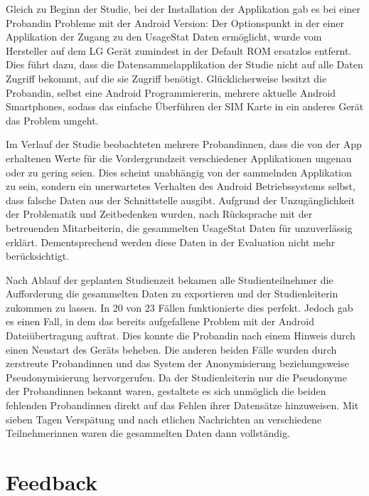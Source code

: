 Gleich zu Beginn der Studie, bei der Installation der Applikation gab es bei einer Probandin Probleme mit der Android Version:
Der Optionspunkt in der einer Applikation der Zugang zu den UsageStat Daten ermöglicht, wurde vom Hersteller auf dem LG Gerät zumindest in der Default ROM ersatzlos entfernt.
Dies führt dazu, dass die Datensammelapplikation der Studie nicht auf alle Daten Zugriff bekommt, auf die sie Zugriff benötigt.
Glücklicherweise besitzt die Probandin, selbst eine Android Programmiererin, mehrere aktuelle Android Smartphones, sodass das einfache Überführen der SIM Karte in ein anderes Gerät das Problem umgeht.
\par
Im Verlauf der Studie beobachteten mehrere Probandinnen,  dass die von der App erhaltenen Werte für die Vordergrundzeit verschiedener Applikationen ungenau oder zu gering seien.
Dies scheint unabhängig von der sammelnden Applikation zu sein, sondern ein unerwartetes Verhalten des Android Betriebssystems selbst, dass falsche Daten aus der Schnittstelle ausgibt.
Aufgrund der Unzugänglichkeit der Problematik und Zeitbedenken wurden, nach Rücksprache mit der betreuenden Mitarbeiterin, die gesammelten UsageStat Daten für unzuverlässig erklärt.
Dementsprechend werden diese Daten in der Evaluation nicht mehr berücksichtigt.
\par
Nach Ablauf der geplanten Studienzeit bekamen alle Studienteilnehmer die Aufforderung die gesammelten Daten zu exportieren und der Studienleiterin zukommen zu lassen. 
In 20 von 23 Fällen funktionierte dies perfekt.
Jedoch gab es einen Fall, in dem das bereits aufgefallene Problem \cite{androidbug} mit der Android Dateiübertragung auftrat.
Dies konnte die Probandin nach einem Hinweis durch einen Neustart des Geräts beheben.
Die anderen beiden Fälle wurden durch zerstreute Probandinnen und das System der Anonymisierung beziehungsweise Pseudonymisierung hervorgerufen.
Da der Studienleiterin nur die Pseudonyme der Probandinnen bekannt waren, gestaltete es sich unmöglich die beiden fehlenden Probandinnen direkt auf das Fehlen ihrer Datensätze hinzuweisen.
Mit sieben Tagen Verspätung und nach etlichen Nachrichten an verschiedene Teilnehmerinnen waren die gesammelten Daten dann vollständig.

\section{Feedback}

